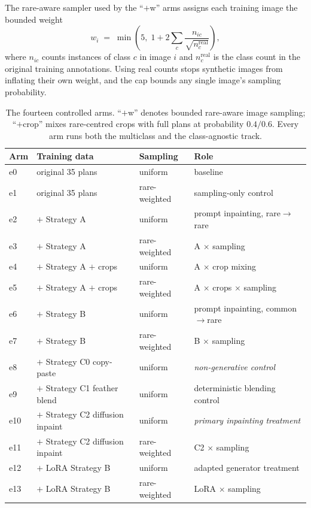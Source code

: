 The rare-aware sampler used by the ``$+$w'' arms assigns each training image the
bounded weight
\[
  w_i \;=\; \min\!\left(5,\; 1 + 2\sum_c \frac{n_{ic}}{\sqrt{n^{\mathrm{real}}_c}}\right),
\]
where $n_{ic}$ counts instances of class $c$ in image $i$ and
$n^{\mathrm{real}}_c$ is the class count in the original training annotations.
Using real counts stops synthetic images from inflating their own weight, and
the cap bounds any single image's sampling probability.

\begin{table}[H]
\centering
\caption{The fourteen controlled arms. ``$+$w'' denotes bounded rare-aware image
sampling; ``$+$crop'' mixes rare-centred crops with full plans at probability
$0.4/0.6$. Every arm runs both the multiclass and the class-agnostic track.}
\label{tab:arms}
\small
\begin{tabular}{@{}llll@{}}
\toprule
Arm & Training data & Sampling & Role \\
\midrule
e0  & original 35 plans                & uniform & baseline \\
e1  & original 35 plans                & rare-weighted & sampling-only control \\
e2  & $+$ Strategy A                   & uniform & prompt inpainting, rare$\rightarrow$rare \\
e3  & $+$ Strategy A                   & rare-weighted & A $\times$ sampling \\
e4  & $+$ Strategy A $+$ crops         & uniform & A $\times$ crop mixing \\
e5  & $+$ Strategy A $+$ crops         & rare-weighted & A $\times$ crops $\times$ sampling \\
e6  & $+$ Strategy B                   & uniform & prompt inpainting, common$\rightarrow$rare \\
e7  & $+$ Strategy B                   & rare-weighted & B $\times$ sampling \\
e8  & $+$ Strategy C0 copy-paste       & uniform & \emph{non-generative control} \\
e9  & $+$ Strategy C1 feather blend    & uniform & deterministic blending control \\
e10 & $+$ Strategy C2 diffusion inpaint& uniform & \emph{primary inpainting treatment} \\
e11 & $+$ Strategy C2 diffusion inpaint& rare-weighted & C2 $\times$ sampling \\
e12 & $+$ LoRA Strategy B              & uniform & adapted generator treatment \\
e13 & $+$ LoRA Strategy B              & rare-weighted & LoRA $\times$ sampling \\
\bottomrule
\end{tabular}
\end{table}

